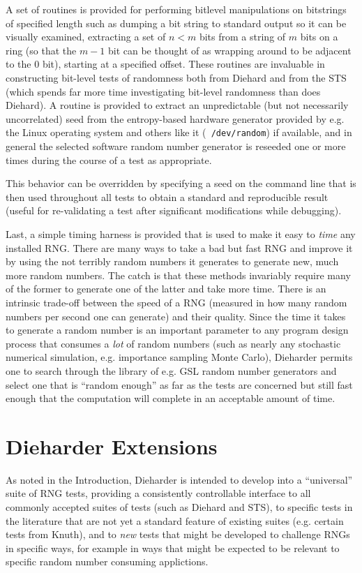 \documentclass{book}
\begin{document}
A set of routines is provided for performing bitlevel manipulations on
bitstrings of specified length such as dumping a bit string to standard
output so it can be visually examined, extracting a set of $n<m$ bits
from a string of $m$ bits on a ring (so that the $m-1$ bit can be
thought of as wrapping around to be adjacent to the $0$ bit), starting
at a specified offset.  These routines are invaluable in constructing
bit-level tests of randomness both from Diehard and from the STS (which
spends far more time investigating bit-level randomness than does
Diehard).  A routine is provided to extract an unpredictable (but not
necessarily uncorrelated) seed from the entropy-based hardware generator
provided by e.g. the Linux operating system and others like it ({\tt
/dev/random}) if available, and in general the selected software random
number generator is reseeded one or more times during the course of a
test as appropriate.  

This behavior can be overridden by specifying a seed on the command line
that is then used throughout all tests to obtain a standard and
reproducible result (useful for re-validating a test after significant
modifications while debugging).  

Last, a simple timing harness is provided that is used to make it easy
to {\em time} any installed RNG.  There are many ways to take a bad but
fast RNG and improve it by using the not terribly random numbers it
generates to generate new, much more random numbers.  The catch is that
these methods invariably require many of the former to generate one of
the latter and take more time.  There is an intrinsic trade-off between
the speed of a RNG (measured in how many random numbers per second one
can generate) and their quality.  Since the time it takes to generate a
random number is an important parameter to any program design process
that consumes a {\em lot} of random numbers (such as nearly any
stochastic numerical simulation, e.g. importance sampling Monte Carlo),
Dieharder permits one to search through the library of e.g. GSL random
number generators and select one that is ``random enough'' as far as
the tests are concerned but still fast enough that the computation will
complete in an acceptable amount of time.

\chapter{Dieharder Extensions}

As noted in the Introduction, Dieharder is intended to develop into a
``universal'' suite of RNG tests, providing a consistently controllable
interface to all commonly accepted suites of tests (such as Diehard and
STS), to specific tests in the literature that are not yet a standard
feature of existing suites (e.g. certain tests from Knuth), and to {\em
new} tests that might be developed to challenge RNGs in specific ways,
for example in ways that might be expected to be relevant to specific
random number consuming applictions.
\end{document}
